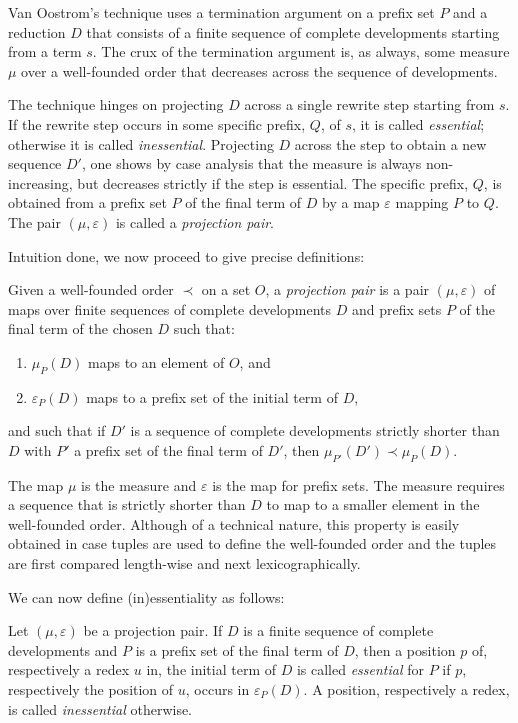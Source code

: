\documentclass{LMCS}
\theoremstyle{plain}
\theoremstyle{definition}
\newcommand{\pmap}{\varepsilon}
\newcommand{\pmapp}[2]{\pmap_{#1}({#2})}
\newcommand{\pme}{\mu}
\newcommand{\pmep}[2]{\pme_{#1}({#2})}
\begin{document}
Van Oostrom's technique uses a termination argument on a prefix set $P$
and a reduction $D$ that consists of a finite sequence of complete developments starting
from a term $s$. The crux of the termination argument is, as always, some measure $\pme$ over a well-founded order that 
decreases across the sequence of developments. 

The technique hinges on projecting $D$ across a single rewrite step starting from $s$. If
the rewrite step occurs in some specific prefix, $Q$, of $s$, it is called \emph{essential};
otherwise it is called \emph{inessential}. Projecting $D$ across the step to obtain a new sequence $D'$, one shows by case analysis that the measure is always non-increasing, but decreases strictly if the step is essential.
The specific prefix, $Q$, is obtained from a prefix set $P$ of the final term of $D$
by a map $\pmap$ mapping $P$ to $Q$. The pair $(\pme,\pmap)$ 
is called a \emph{projection pair}.

Intuition done, we now proceed to give precise definitions:

\begin{defi}
\label{def:pp}
Given a well-founded order $\prec$ on a set $O$, a \emph{projection pair} is a pair $(\pme, \pmap)$ of maps over finite sequences of complete developments $D$ and prefix sets $P$ of the final term of the chosen $D$ such that:
\begin{enumerate}[$\bullet$]
\item
$\pmep{P}{D}$ maps to an element of $O$, and
\item
$\pmapp{P}{D}$ maps to a prefix set of the initial term of $D$,
\end{enumerate}
and such that if $D'$ is a sequence of complete developments strictly shorter than $D$ with $P'$ a prefix set of the final term of $D'$, then $\pmep{P'}{D'} \prec \pmep{P}{D}$.
\end{defi}
\noindent The map $\pme$ is the measure and $\pmap$ is the map for prefix sets. The measure requires a sequence that is strictly shorter than $D$ to map to a smaller element in the well-founded order. Although of a technical nature, this property is easily obtained in case tuples are used to define the well-founded order and the tuples are first compared length-wise and next lexicographically.

We can now define (in)essentiality as follows:
\begin{defi}
Let $(\pme, \pmap)$ be a projection pair. If $D$ is a finite sequence of complete developments and $P$ is a prefix set of the final term of $D$, then a position $p$ of, respectively a redex $u$ in, the initial term of $D$ is called \emph{essential} for $P$ if $p$, respectively the position of $u$, occurs in $\pmapp{P}{D}$. A position, respectively a redex, is called \emph{inessential} otherwise.
\end{defi}
\end{document}
